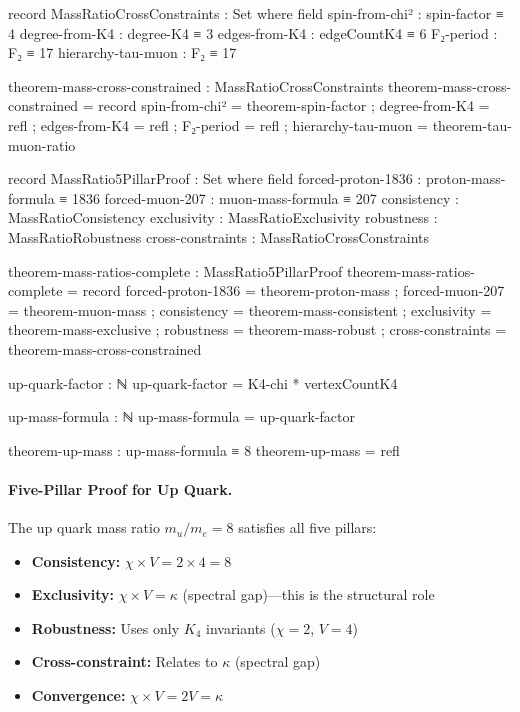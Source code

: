 \documentclass[11pt,a4paper]{book}
\begin{document}
\begin{code}
record MassRatioCrossConstraints : Set where
  field
    spin-from-chi²      : spin-factor ≡ 4
    degree-from-K4      : degree-K4 ≡ 3
    edges-from-K4       : edgeCountK4 ≡ 6
    F₂-period          : F₂ ≡ 17
    hierarchy-tau-muon  : F₂ ≡ 17

theorem-mass-cross-constrained : MassRatioCrossConstraints
theorem-mass-cross-constrained = record
  { spin-from-chi² = theorem-spin-factor
  ; degree-from-K4 = refl
  ; edges-from-K4 = refl
  ; F₂-period = refl
  ; hierarchy-tau-muon = theorem-tau-muon-ratio
  }

record MassRatio5PillarProof : Set where
  field
    forced-proton-1836   : proton-mass-formula ≡ 1836
    forced-muon-207      : muon-mass-formula ≡ 207
    consistency          : MassRatioConsistency
    exclusivity          : MassRatioExclusivity
    robustness           : MassRatioRobustness
    cross-constraints    : MassRatioCrossConstraints

theorem-mass-ratios-complete : MassRatio5PillarProof
theorem-mass-ratios-complete = record
  { forced-proton-1836 = theorem-proton-mass
  ; forced-muon-207 = theorem-muon-mass
  ; consistency = theorem-mass-consistent
  ; exclusivity = theorem-mass-exclusive
  ; robustness = theorem-mass-robust
  ; cross-constraints = theorem-mass-cross-constrained
  }
\end{code}

\begin{code}
up-quark-factor : ℕ
up-quark-factor = K4-chi * vertexCountK4

up-mass-formula : ℕ
up-mass-formula = up-quark-factor

theorem-up-mass : up-mass-formula ≡ 8
theorem-up-mass = refl
\end{code}

\paragraph{Five-Pillar Proof for Up Quark.}
The up quark mass ratio $m_u/m_e = 8$ satisfies all five pillars:
\begin{itemize}
\item \textbf{Consistency:} $\chi \times V = 2 \times 4 = 8$
\item \textbf{Exclusivity:} $\chi \times V = \kappa$ (spectral gap)---this is the structural role
\item \textbf{Robustness:} Uses only $K_4$ invariants ($\chi = 2$, $V = 4$)
\item \textbf{Cross-constraint:} Relates to $\kappa$ (spectral gap)
\item \textbf{Convergence:} $\chi \times V = 2V = \kappa$
\end{itemize}
\end{document}
